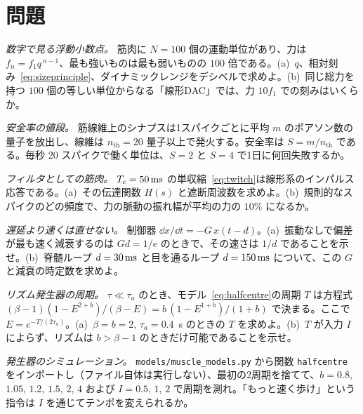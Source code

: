 \section{問題}

\begin{exercise}[\lvlA]
\label{ex:13:1}
\emph{数字で見る浮動小数点。} 筋肉に $N=100$ 個の運動単位があり、力は $f_n=f_1q^{\,n-1}$、最も強いものは最も弱いものの $100$ 倍である。(a)~$q$、相対刻み~\eqref{eq:sizeprinciple}、ダイナミックレンジをデシベルで求めよ。(b)~同じ総力を持つ $100$ 個の等しい単位からなる「線形DAC」では、力 $10f_1$ での刻みはいくらか。
\end{exercise}

\begin{exercise}[\lvlA]
\label{ex:13:2}
\emph{安全率の値段。} 筋線維上のシナプスは1スパイクごとに平均 $m$ のポアソン数の量子を放出し、線維は $n_{\text{th}}=20$ 量子以上で発火する。安全率は $S=m/n_{\text{th}}$ である。毎秒 $20$ スパイクで働く単位は、$S=2$ と $S=4$ で1日に何回失敗するか。
\end{exercise}

\begin{exercise}[\lvlB]
\label{ex:13:3}
\emph{フィルタとしての筋肉。} $T_c=50\,\text{ms}$ の単収縮~\eqref{eq:twitch}は線形系のインパルス応答である。(a)~その伝達関数 $H(s)$ と遮断周波数を求めよ。(b)~規則的なスパイクのどの頻度で、力の脈動の振れ幅が平均の力の $10\%$ になるか。
\end{exercise}

\begin{exercise}[\lvlB]
\label{ex:13:4}
\emph{遅延より速くは直せない。} 制御器 $\dd x/\dd t=-G\,x(t-d)$。(a)~振動なしで偏差が最も速く減衰するのは $Gd=1/e$ のときで、その速さは $1/d$ であることを示せ。(b)~脊髄ループ $d=30\,\text{ms}$ と目を通るループ $d=150\,\text{ms}$ について、この $G$ と減衰の時定数を求めよ。
\end{exercise}

\begin{exercise}[\lvlB]
\label{ex:13:5}
\emph{リズム発生器の周期。} $\tau\ll\tau_a$ のとき、モデル~\eqref{eq:halfcentre}の周期 $T$ は方程式 $(\beta-1)(1-E^{2+b})/(\beta-E)=b\,(1-E^{1+b})/(1+b)$ で決まる。ここで $E=e^{-T/(2\tau_a)}$。(a)~$\beta=b=2$, $\tau_a=0.4$~s のときの $T$ を求めよ。(b)~$T$ が入力 $I$ によらず、リズムは $b>\beta-1$ のときだけ可能であることを示せ。
\end{exercise}

\begin{exercise}[\lvlB]
\label{ex:13:6}
\emph{発生器のシミュレーション。} \texttt{models/\allowbreak muscle\_models.py} から関数 \texttt{halfcentre} をインポートし（ファイル自体は実行しない）、最初の2周期を捨てて、$b=0.8$, $1.05$, $1.2$, $1.5$, $2$, $4$ および $I=0.5$, $1$, $2$ で周期を測れ。「もっと速く歩け」という指令は $I$ を通じてテンポを変えられるか。
\end{exercise}


